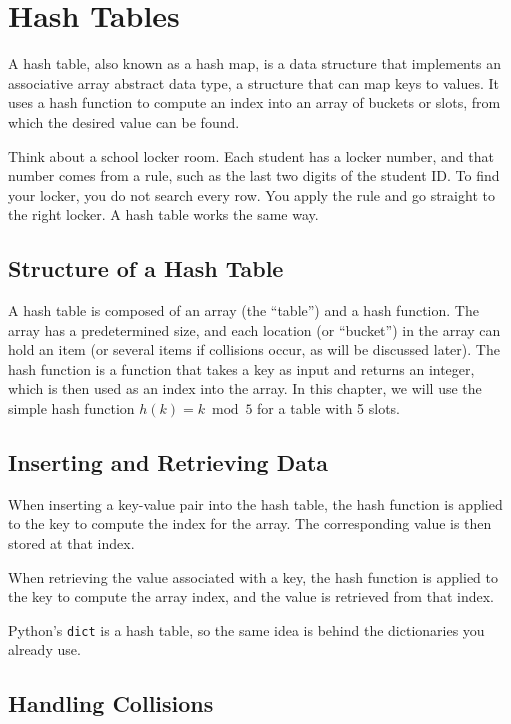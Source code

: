 \chapter{Hash Tables}

A hash table, also known as a hash map, is a data structure that
implements an associative array abstract data type, a structure that
can map keys to values. It uses a hash function to compute an index
into an array of buckets or slots, from which the desired value can be
found.

Think about a school locker room. Each student has a locker number, and that number comes from a rule, such as the last two digits of the student ID. To find your locker, you do not search every row. You apply the rule and go straight to the right locker. A hash table works the same way.

\section{Structure of a Hash Table}

A hash table is composed of an array (the ``table'') and a hash
function. The array has a predetermined size, and each location (or
``bucket'') in the array can hold an item (or several items if
collisions occur, as will be discussed later). The hash function is a
function that takes a key as input and returns an integer, which is
then used as an index into the array. In this chapter, we will use the simple hash function $h(k) = k \bmod 5$ for a table with 5 slots.

\section{Inserting and Retrieving Data}

When inserting a key-value pair into the hash table, the hash function
is applied to the key to compute the index for the array. The
corresponding value is then stored at that index.

When retrieving the value associated with a key, the hash function is
applied to the key to compute the array index, and the value is
retrieved from that index.

Python's \texttt{dict} is a hash table, so the same idea is behind the dictionaries you already use.

\section{Handling Collisions}

